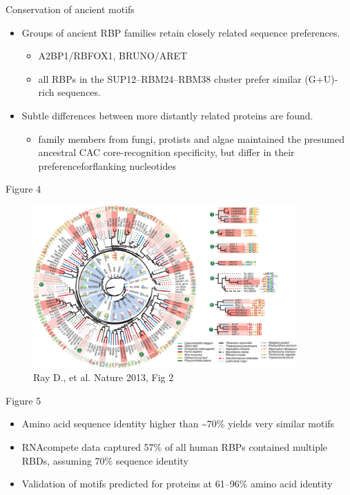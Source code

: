 \documentclass[professionalfont, 12pt, default]{beamer}
\providecommand{\tightlist}{%
    \setlength{\itemsep}{0pt}\setlength{\parskip}{0pt}}
\begin{document}
\begin{frame}{Conservation of ancient motifs}

\begin{itemize}
\tightlist
\item
  Groups of ancient RBP families retain closely related sequence
  preferences.

  \begin{itemize}
  \tightlist
  \item
    A2BP1/RBFOX1, BRUNO/ARET
  \item
    all RBPs in the SUP12--RBM24--RBM38 cluster prefer similar
    (G+U)-rich sequences.
  \end{itemize}
\item
  Subtle differences between more distantly related proteins are found.

  \begin{itemize}
  \tightlist
  \item
    family members from fungi, protists and algae maintained the
    presumed ancestral CAC core-recognition specificity, but differ in
    their preferenceforflanking nucleotides
  \end{itemize}
\end{itemize}

\end{frame}

\begin{frame}{Figure 4}

\begin{figure}
\centering
\includegraphics[width=0.90000\textwidth]{img/f2.jpg}
\caption{Ray D., et al. Nature 2013, Fig 2}
\end{figure}

\end{frame}

\begin{frame}{Figure 5}

\begin{itemize}
\tightlist
\item
  Amino acid sequence identity higher than \textasciitilde{}70\% yields
  very similar motifs
\item
  RNAcompete data captured 57\% of all human RBPs contained multiple
  RBDs, assuming 70\% sequence identity
\item
  Validation of motifs predicted for proteins at 61--96\% amino acid
  identity
\end{itemize}

\end{frame}
\end{document}
